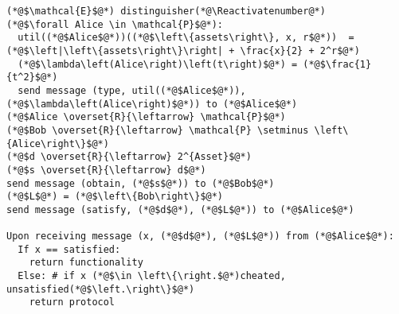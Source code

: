 \Suppressnumber
\begin{lstlisting}[label=distenv, style=numbers]
(*@$\mathcal{E}$@*) distinguisher(*@\Reactivatenumber@*)
(*@$\forall Alice \in \mathcal{P}$@*):
  util((*@$Alice$@*))((*@$\left\{assets\right\}, x, r$@*))  = (*@$\left|\left\{assets\right\}\right| + \frac{x}{2} + 2^r$@*)
  (*@$\lambda\left(Alice\right)\left(t\right)$@*) = (*@$\frac{1}{t^2}$@*)
  send message (type, util((*@$Alice$@*)), (*@$\lambda\left(Alice\right)$@*)) to (*@$Alice$@*)
(*@$Alice \overset{R}{\leftarrow} \mathcal{P}$@*)
(*@$Bob \overset{R}{\leftarrow} \mathcal{P} \setminus \left\{Alice\right\}$@*)
(*@$d \overset{R}{\leftarrow} 2^{Asset}$@*)
(*@$s \overset{R}{\leftarrow} d$@*)
send message (obtain, (*@$s$@*)) to (*@$Bob$@*)
(*@$L$@*) = (*@$\left\{Bob\right\}$@*)
send message (satisfy, (*@$d$@*), (*@$L$@*)) to (*@$Alice$@*)

Upon receiving message (x, (*@$d$@*), (*@$L$@*)) from (*@$Alice$@*):
  If x == satisfied:
    return functionality
  Else: # if x (*@$\in \left\{\right.$@*)cheated, unsatisfied(*@$\left.\right\}$@*)
    return protocol
\end{lstlisting}
